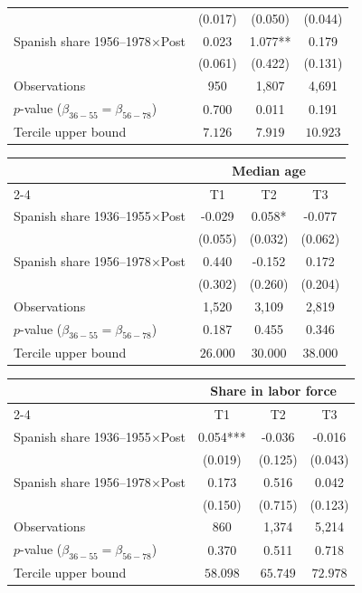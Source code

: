 \begin{table}[!h]
\begin{tabular*}{\textwidth}{l@{\extracolsep{\fill}}ccc}
 & (0.017) & (0.050) & (0.044) \\
Spanish share 1956--1978\(\times\)Post & 0.023 & 1.077** & 0.179 \\
 & (0.061) & (0.422) & (0.131) \\
\addlinespace
Observations & 950 & 1,807 & 4,691 \\
\(p\)-value (\(\beta_{36{-}55}=\beta_{56{-}78}\)) & 0.700 & 0.011 & 0.191 \\
Tercile upper bound & \(7.126\) & \(7.919\) & \(10.923\) \\
\hline
\end{tabular*}
\begin{tabular*}{\textwidth}{l@{\extracolsep{\fill}}ccc}
& \multicolumn{3}{c}{Median age} \\
\cmidrule(l){2-4}
& T1 & T2 & T3 \\
\hline
Spanish share 1936--1955\(\times\)Post & -0.029 & 0.058* & -0.077 \\
 & (0.055) & (0.032) & (0.062) \\
Spanish share 1956--1978\(\times\)Post & 0.440 & -0.152 & 0.172 \\
 & (0.302) & (0.260) & (0.204) \\
\addlinespace
Observations & 1,520 & 3,109 & 2,819 \\
\(p\)-value (\(\beta_{36{-}55}=\beta_{56{-}78}\)) & 0.187 & 0.455 & 0.346 \\
Tercile upper bound & \(26.000\) & \(30.000\) & \(38.000\) \\
\hline
\end{tabular*}
\begin{tabular*}{\textwidth}{l@{\extracolsep{\fill}}ccc}
& \multicolumn{3}{c}{Share in labor force} \\
\cmidrule(l){2-4}
& T1 & T2 & T3 \\
\hline
Spanish share 1936--1955\(\times\)Post & 0.054*** & -0.036 & -0.016 \\
 & (0.019) & (0.125) & (0.043) \\
Spanish share 1956--1978\(\times\)Post & 0.173 & 0.516 & 0.042 \\
 & (0.150) & (0.715) & (0.123) \\
\addlinespace
Observations & 860 & 1,374 & 5,214 \\
\(p\)-value (\(\beta_{36{-}55}=\beta_{56{-}78}\)) & 0.370 & 0.511 & 0.718 \\
Tercile upper bound & \(58.098\) & \(65.749\) & \(72.978\) \\
\hline
\end{tabular*}

\end{table}
